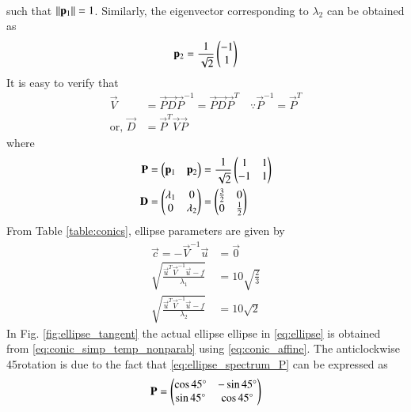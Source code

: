 \begin{enumerate}[label=\thesection.\arabic*.,ref=\thesection.\theenumi]
\begin{align}
\end{align}
such that $\left\lVert\mathbf{p}_1\right\rVert = 1$.  Similarly, the eigenvector corresponding to $\lambda_2$ can be obtained as
\begin{align}
 \mathbf{p}_2 = \frac{1}{\sqrt{2}}\begin{pmatrix}-1 \\ 1\end{pmatrix}
\end{align}
It is easy to verify that 
\begin{align}
\label{eq:ellipse_spectrum}
\vec{V} &= \vec{P}\vec{D}\vec{P}^{-1}=\vec{P}\vec{D}\vec{P}^T \quad \because \vec{P}^{-1} = \vec{P}^{T}
\\
\text{or, } \vec{D} &= \vec{P}^T\vec{V}\vec{P}
\end{align}
where 
\begin{align}
\label{eq:ellipse_spectrum_P}
\mathbf{P} & =\begin{pmatrix}\mathbf{p}_1 & \mathbf{p}_2\end{pmatrix} = \frac{1}{\sqrt{2}}\begin{pmatrix}1 & 1\\ -1 & 1\end{pmatrix}
\\
 \mathbf{D} &= \begin{pmatrix}\lambda_1 & 0 \\ 0 & \lambda_2\end{pmatrix} =\begin{pmatrix}\frac{3}{2} & 0\\ 0 & \frac{1}{2}\end{pmatrix}
\label{eq:ellipse_spectrum_D}
\end{align}
From Table \ref{table:conics}, ellipse parameters are given by
\begin{align}
\vec{c} =-\vec{V}^{-1}\vec{u} &= \vec{0}
\\
\sqrt{\frac{\vec{u}^T\vec{V}^{-1}\vec{u}-f}{\lambda_1}} &= 10 \sqrt{\frac{2}{3}}
\\
\sqrt{\frac{\vec{u}^T\vec{V}^{-1}\vec{u}-f}{\lambda_2}} &= 10 \sqrt{2}
\end{align}
In Fig. \ref{fig:ellipse_tangent} the actual ellipse ellipse in \eqref{eq:ellipse} is obtained from \eqref{eq:conic_simp_temp_nonparab} using \eqref{eq:conic_affine}.  The anticlockwise 45\degree rotation is due to the fact that 
\eqref{eq:ellipse_spectrum_P} can be expressed as
\begin{align}
\label{eq:ellipse_spectrum_P_rot}
\vec{P}  = \myvec{\cos 45\degree & -\sin 45\degree\\ \sin 45\degree & \cos 45\degree}

\end{align}
\end{enumerate}

